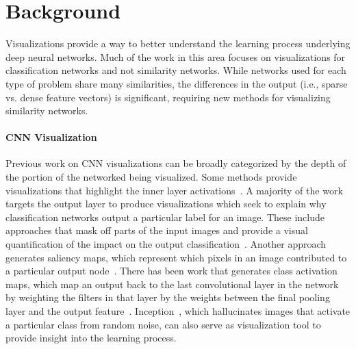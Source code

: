 
\section{Background}
Visualizations provide a way to better understand the learning process underlying deep neural networks. Much of the work in this area focuses on visualizations for classification networks and not similarity networks. While networks used for each type of problem share many similarities, the differences in the output (i.e., sparse vs. dense feature vectors) is significant, requiring new methods for visualizing similarity networks.

\paragraph{CNN Visualization}
Previous work on CNN visualizations can be broadly categorized by
the depth of the portion of the networked being visualized. Some methods provide visualizations that highlight the inner layer activations~\cite{netdissect2017,visualization_techreport,scenecnn_iclr15}. A majority of the work targets the output layer to produce visualizations which seek to explain
why classification networks output a particular label for an image. These include approaches that mask off parts of the input images and provide a visual quantification of the impact on the output classification~\cite{ZeilerF13}. Another approach generates saliency maps, which represent which pixels in an image contributed to a particular output node~\cite{deepInside}. There has been work that generates class activation maps, which map an output back to the last convolutional layer in the network by weighting the filters in that layer by the weights between the final pooling layer and the output feature~\cite{cam}. Inception~\cite{szegedy2015going}, which hallucinates images that activate a particular class from random noise, can also serve as visualization tool to provide insight into the learning process. 

